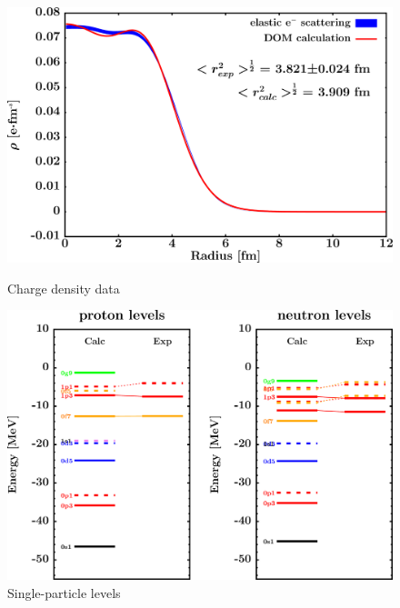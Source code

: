 \begin{figure}[H]
    \centering
    \begin{minipage}{0.45\textwidth}
        \centering
        \includegraphics[width=1.0\textwidth]{figures/ni64_chargeDensity.png}
        \caption{Charge density data}
        \label{DOMFitData_ni64_chargeDensity}
    \end{minipage}\hfill
    \begin{minipage}{0.45\textwidth}
        \centering
        \includegraphics[width=1.0\textwidth]{figures/ni64_SPLevels.png}
        \caption{Single-particle levels}
        \label{DOMFitData_ni64_SPLevels}
    \end{minipage}
\end{figure}

\afterpage{\clearpage}

